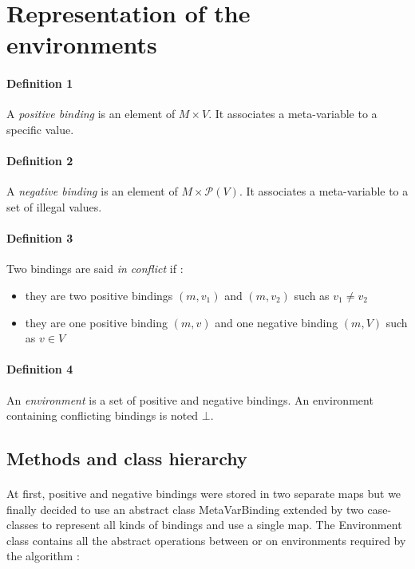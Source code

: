 \documentclass{report}
\begin{document}
\section{Representation of the environments}

\paragraph{Definition 1}
A \textit{positive binding} is an element of $M \times V$. It associates a meta-variable to a specific value.

\paragraph{Definition 2}
A \textit{negative binding} is an element of $M \times \mathscr{P}(V)$. It associates a meta-variable to a set of illegal values.

\paragraph{Definition 3}
Two bindings are said \textit{in conflict} if :

\vspace{1.5mm}
\begin{itemize}
\item they are two positive bindings $(m,v_1)$ and $(m,v_2)$ such as $v_1 \neq v_2$\vspace{1mm}
\item they are one positive binding $(m,v)$ and one negative binding $(m,V)$ such as
$v \in V$\vspace{1mm}
\end{itemize}

\paragraph{Definition 4}
An \textit{environment} is a set of positive and negative bindings.  An environment 
containing conflicting bindings is noted $\bot$.

\subsection{Methods and class hierarchy}

\paragraph{}
\hspace{4mm}At first, positive and negative bindings were stored in two separate maps but we finally decided 
to use an abstract class MetaVarBinding extended by two case-classes to represent all kinds of bindings and use a single map.
The Environment class contains all the abstract operations between or on environments required by the algorithm :
\end{document}

